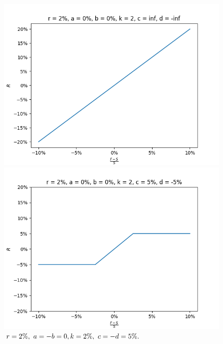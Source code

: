\documentclass[10pt]{article}
\begin{document}
\begin{figure}[!htb]
  \includegraphics[width=\linewidth]{./plots/r_0.02_a_0_b_0_c_inf_d_-inf_k_2.png}
   \caption{$\\r=2\%,\ a=-b=0,\\ k=2\%,\ c=-d=0.$}\label{fig:clamp1}
\endminipage\hfill
{}
  \includegraphics[width=\linewidth]{./plots/r_0.02_a_0_b_0_c_0.05_d_-0.05_k_2.png}
  \caption{$\\r=2\%,\ a=-b=0,\\ k=2\%,\ c=-d=5\%.$}\label{fig:clamp22}
\endminipage\hfill
{}%

\end{figure}
\end{document}
